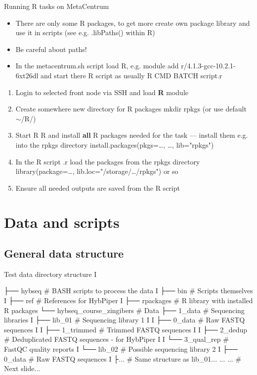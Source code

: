 \documentclass[compress,  xelatex, 11pt, xcolor=x11names, aspectratio=169,
	hyperref={
		bookmarks=true,
		unicode=true,
		colorlinks=true,
		pdftitle={HybSeq course},
		plainpages=false,
		pdfauthor={Vojtech Zeisek},
		pdfsubject={Practical processing of HybSeq target enrichment sequencing data on computing grids like MetaCentrum},
		pdfcreator={XeLaTeX},
		pdfkeywords={BASH, command line, GNU, HybSeq, Linux, MetaCentrum, sequencing shell, target enrichment},
		linkcolor=Turquoise4, %
		anchorcolor=DodgerBlue4, %
		citecolor=DodgerBlue4, %
		filecolor=DodgerBlue4, %
		menucolor=Tan4, %
		urlcolor=DarkOliveGreen4 %
		},
	url={hyphens, lowtilde} %
	]{beamer}
\renewcommand{\texttt}[1]{\colorbox{Cornsilk2}{{\ttfamily #1}}}
\renewcommand{\alert}[1]{\textcolor{OrangeRed3}{#1}}
\begin{document}
\begin{frame}{Running R tasks on MetaCentrum}
	\begin{itemize}
		\item There are only some R packages, to get more create own package library and use it in scripts (see e.g. \texttt{.libPaths()} within \texttt{R})
		\item \alert{Be careful about paths!}
		\item In the \texttt{metacentrum.sh} script load R, e.g. \texttt{module add r/4.1.3-gcc-10.2.1-6xt26dl} and start there R script as usually \texttt{R CMD BATCH script.r}
	\end{itemize}
	\begin{enumerate}
		\item Login to selected front node via SSH and load \textbf{R} module
		\item Create somewhere new directory for R packages \texttt{mkdir rpkgs} (or use default \texttt{$\sim$/R/})
		\item Start R \texttt{R} and install \textbf{all} R packages needed for the task --- install them e.g. into the \texttt{rpkgs} directory \texttt{install.packages(pkgs=\ldots, \ldots, lib="rpkgs")}
		\item In the R script \texttt{*.r} load the packages from the \texttt{rpkgs} directory \texttt{library(package=\ldots, lib.loc="/storage/\ldots/rpkgs")} or so
		\item Ensure all needed outputs are saved from the R script
	\end{enumerate}
\end{frame}

\section{Data and scripts}

\subsection{General data structure}

\begin{frame}[fragile]{Test data directory structure I}
	\label{datastructure}
	\begin{bashcode}
    ├── hybseq # BASH scripts to process the data
    I   ├── bin # Scripts themselves
    I   ├── ref # References for HybPiper
    I   ├── rpackages # R library with installed R packages
    └── hybseq_course_zingibers # Data
        ├── 1_data # Sequencing libraries
        I   ├── lib_01 # Sequencing library 1
        I   I   ├── 0_data # Raw FASTQ sequences
        I   I   ├── 1_trimmed # Trimmed FASTQ sequences
        I   I   ├── 2_dedup # Deduplicated FASTQ sequences - for HybPiper
        I   I   └── 3_qual_rep # FastQC quality reports
        I   └── lib_02 # Possible sequencing library 2
        I       ├── 0_data # Raw FASTQ sequences
        I       ├... # Same structure as lib_01...
        ...     ... # Next slide...
	\end{bashcode}
\end{frame}
\end{document}
